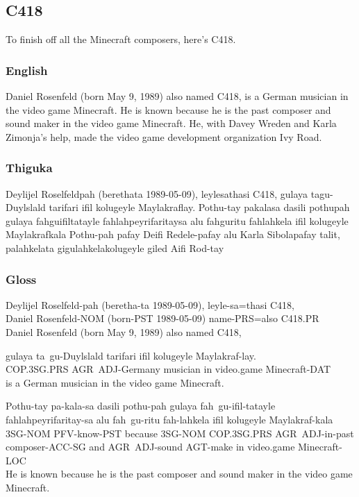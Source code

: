 \newpage

\subsection{C418}
To finish off all the Minecraft composers, here's C418.

\subsubsection*{English}
Daniel Rosenfeld (born May 9, 1989) also named C418, is a German musician in the video game Minecraft.
He is known because he is the past composer and sound maker in the video game Minecraft.
He, with Davey Wreden and Karla Zimonja's help, made the video game development organization Ivy Road.

\subsubsection*{Thiguka}
Deylijel Roselfeldpah (berethata 1989-05-09), leylesathasi C418, gulaya tagu-Duylslald tarifari ifil kolugeyle Maylakraflay.
Pothu-tay pakalasa dasili pothupah gulaya fahguifiltatayle fahlahpeyrifaritaysa alu fahguritu fahlahkela ifil kolugeyle Maylakrafkala
Pothu-pah pafay Deifi Redele-pafay alu Karla Sibolapafay talit, palahkelata gigulahkelakolugeyle giled Aifi Rod-tay

\subsubsection*{Gloss}

\begin{exe}
    \ex{} \gll{}Deylijel Roselfeld-pah (beretha-ta 1989-05-09), leyle-sa=thasi C418,\\
                Daniel Rosenfeld-NOM (born-PST 1989-05-09) name-PRS=also C418.PR\\
          \glt{}Daniel Rosenfeld (born May 9, 1989) also named C418,
\end{exe}

\begin{exe}
    \ex{} \gll{}gulaya ta~gu-Duylslald tarifari ifil kolugeyle Maylakraf-lay.\\
                COP.3SG.PRS AGR~ADJ-Germany musician in video.game Minecraft-DAT\\
          \glt{}is a German musician in the video game Minecraft.
\end{exe}

\begin{exe}
    \ex{} \gll{}Pothu-tay pa-kala-sa dasili pothu-pah gulaya fah~gu-ifil-tatayle fahlahpeyrifaritay-sa alu fah~gu-ritu fah-lahkela ifil kolugeyle Maylakraf-kala\\
                3SG-NOM PFV-know-PST because 3SG-NOM COP.3SG.PRS AGR~ADJ-in-past composer-ACC-SG and AGR~ADJ-sound AGT-make in video.game Minecraft-LOC\\
          \glt{}He is known because he is the past composer and sound maker in the video game Minecraft.
\end{exe}

